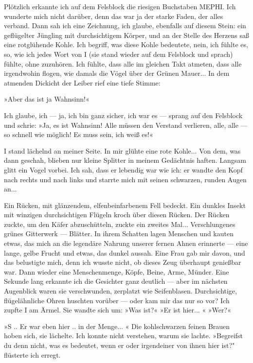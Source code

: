 Plötzlich erkannte ich auf dem Felsblock die riesigen Buchstaben
MEPHI. Ich wunderte mich nicht darüber, denn das war ja der starke
Faden, der alles verband. Dann sah ich eine Zeichnung, ich glaube,
ebenfalls auf diesem Stein: ein geflügelter Jüngling mit
durchsichtigem Körper, und an der Stelle des Herzens saß eine
rotglühende Kohle. Ich begriff, was diese Kohle bedeutete, nein,
ich fühlte es, so, wie ich jedes Wort von I (sie stand wieder auf
dem Felsblock und sprach) fühlte, ohne zuzuhören. Ich fühlte, dass
alle im gleichen Takt atmeten, dass alle irgendwohin flogen, wie
damals die Vögel über der Grünen Mauer... In dem atmenden Dickicht
der Leiber rief eine tiefe Stimme:

»Aber das ist ja Wahnsinn!«

Ich glaube, ich — ja, ich bin ganz sicher, ich war es — sprang auf
den Felsblock und schrie: »Ja, es ist Wahnsinn! Alle müssen den
Verstand verlieren, alle, alle — so schnell wie möglich! Es muss
sein, ich weiß es!«

I stand lächelnd an meiner Seite. In mir glühte eine rote Kohle...
Von dem, was dann geschah, blieben nur kleine Splitter in meinem
Gedächtnis haften. Langsam glitt ein Vogel vorbei. Ich sah, dass er
lebendig war wie ich: er wandte den Kopf nach rechts und nach links
und starrte mich mit seinen schwarzen, runden Augen an...

Ein Rücken, mit glänzendem, elfenbeinfarbenem Fell bedeckt. Ein
dunkles Insekt mit winzigen durchsichtigen Flügeln kroch über
diesen Rücken. Der Rücken zuckte, um den Käfer abzuschütteln,
zuckte ein zweites Mal... Verschlungenes grünes Gitterwerk —
Blätter. In ihrem Schatten lagen Menschen und kauten etwas, das
mich an die legendäre Nahrung unserer fernen Ahnen erinnerte — eine
lange, gelbe Frucht und etwas, das dunkel aussah. Eine Frau gab mir
davon, und das belustigte mich, denn ich wusste nicht, ob dieses
Zeug überhaupt genießbar war. Dann wieder eine Menschenmenge,
Köpfe, Beine, Arme, Münder. Eine Sekunde lang erkannte ich die
Gesichter ganz deutlich — aber im nächsten Augenblick waren sie
verschwunden, zerplatzt wie Seifenblasen. Durchsichtige,
flügelähnliche Ohren huschten vorüber — oder kam mir das nur so
vor? Ich zupfte I am Ärmel. Sie wandte sich um: »Was ist?« »Er ist
hier... « »Wer?«

»S .. Er war eben hier .. in der Menge... « Die kohlschwarzen
feinen Brauen hoben sich, sie lächelte. Ich konnte nicht verstehen,
warum sie lachte. »Begreifst du denn nicht, was es bedeutet, wenn
er oder irgendeiner von ihnen hier ist?" flüsterte ich erregt.

